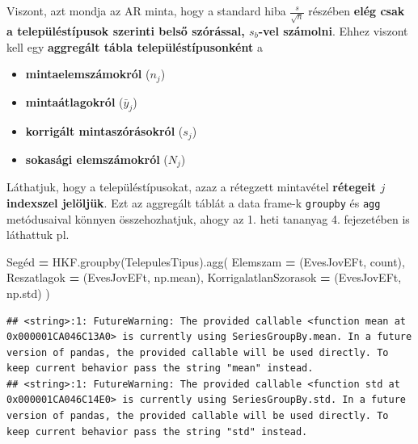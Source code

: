 \documentclass[
]{book}
\newenvironment{Shaded}{\begin{snugshade}}{\end{snugshade}}
\newcommand{\NormalTok}[1]{#1}
\newcommand{\OperatorTok}[1]{\textcolor[rgb]{0.81,0.36,0.00}{\textbf{#1}}}
\newcommand{\StringTok}[1]{\textcolor[rgb]{0.31,0.60,0.02}{#1}}
\providecommand{\tightlist}{%
  \setlength{\itemsep}{0pt}\setlength{\parskip}{0pt}}
\begin{document}
Viszont, azt mondja az AR minta, hogy a standard hiba \(\frac{s}{\sqrt{n}}\) részében \textbf{elég csak a településtípusok szerinti belső szórással, \(s_b\)-vel számolni}. Ehhez viszont kell egy \textbf{aggregált tábla településtípusonként} a

\begin{itemize}
\tightlist
\item
  \textbf{mintaelemszámokról} (\(n_j\))
\item
  \textbf{mintaátlagokról} (\(\bar{y}_j\))
\item
  \textbf{korrigált mintaszórásokról} (\(s_j\))
\item
  \textbf{sokasági elemszámokról} (\(N_j\))
\end{itemize}

Láthatjuk, hogy a településtípusokat, azaz a rétegzett mintavétel \textbf{rétegeit \(j\) indexszel jelöljük}. Ezt az aggregált táblát a data frame-k \texttt{groupby} és \texttt{agg} metódusaival könnyen összehozhatjuk, ahogy az 1. heti tananyag 4. fejezetében is láthattuk pl.

\begin{Shaded}
\begin{Highlighting}[]
\NormalTok{Segéd }\OperatorTok{=}\NormalTok{ HKF.groupby(}\StringTok{\textquotesingle{}TelepulesTipus\textquotesingle{}}\NormalTok{).agg(}
\NormalTok{  Elemszam }\OperatorTok{=}\NormalTok{ (}\StringTok{\textquotesingle{}EvesJovEFt\textquotesingle{}}\NormalTok{, }\StringTok{\textquotesingle{}count\textquotesingle{}}\NormalTok{),}
\NormalTok{  Reszatlagok }\OperatorTok{=}\NormalTok{ (}\StringTok{\textquotesingle{}EvesJovEFt\textquotesingle{}}\NormalTok{, np.mean),}
\NormalTok{  KorrigalatlanSzorasok }\OperatorTok{=}\NormalTok{ (}\StringTok{\textquotesingle{}EvesJovEFt\textquotesingle{}}\NormalTok{, np.std)}
\NormalTok{)}
\end{Highlighting}
\end{Shaded}

\begin{verbatim}
## <string>:1: FutureWarning: The provided callable <function mean at 0x000001CA046C13A0> is currently using SeriesGroupBy.mean. In a future version of pandas, the provided callable will be used directly. To keep current behavior pass the string "mean" instead.
## <string>:1: FutureWarning: The provided callable <function std at 0x000001CA046C14E0> is currently using SeriesGroupBy.std. In a future version of pandas, the provided callable will be used directly. To keep current behavior pass the string "std" instead.
\end{verbatim}
\end{document}
